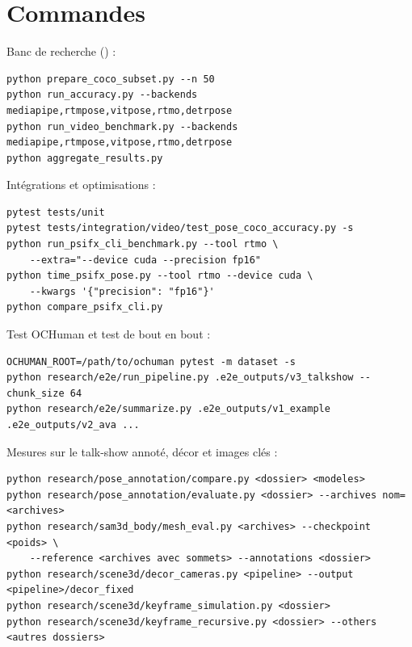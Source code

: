 \documentclass[11pt,a4paper]{report}
\newcommand{\code}[1]{\texttt{\detokenize{#1}}}
\begin{document}
\section{Commandes}

Banc de recherche (\code{research/benchmark/}) :
{\footnotesize
\begin{verbatim}
python prepare_coco_subset.py --n 50
python run_accuracy.py --backends mediapipe,rtmpose,vitpose,rtmo,detrpose
python run_video_benchmark.py --backends mediapipe,rtmpose,vitpose,rtmo,detrpose
python aggregate_results.py
\end{verbatim}
}

Intégrations et optimisations :
{\footnotesize
\begin{verbatim}
pytest tests/unit
pytest tests/integration/video/test_pose_coco_accuracy.py -s
python run_psifx_cli_benchmark.py --tool rtmo \
    --extra="--device cuda --precision fp16"
python time_psifx_pose.py --tool rtmo --device cuda \
    --kwargs '{"precision": "fp16"}'
python compare_psifx_cli.py
\end{verbatim}
}

Test OCHuman et test de bout en bout :
{\footnotesize
\begin{verbatim}
OCHUMAN_ROOT=/path/to/ochuman pytest -m dataset -s
python research/e2e/run_pipeline.py .e2e_outputs/v3_talkshow --chunk_size 64
python research/e2e/summarize.py .e2e_outputs/v1_example .e2e_outputs/v2_ava ...
\end{verbatim}
}

Mesures sur le talk-show annoté, décor et images clés :
{\footnotesize
\begin{verbatim}
python research/pose_annotation/compare.py <dossier> <modeles>
python research/pose_annotation/evaluate.py <dossier> --archives nom=<archives>
python research/sam3d_body/mesh_eval.py <archives> --checkpoint <poids> \
    --reference <archives avec sommets> --annotations <dossier>
python research/scene3d/decor_cameras.py <pipeline> --output <pipeline>/decor_fixed
python research/scene3d/keyframe_simulation.py <dossier>
python research/scene3d/keyframe_recursive.py <dossier> --others <autres dossiers>
\end{verbatim}
}
\end{document}
